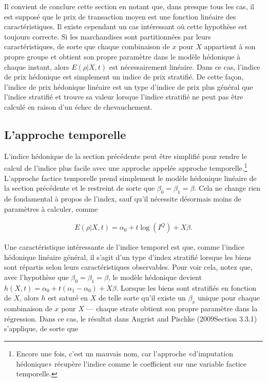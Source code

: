 \documentclass[
]{article}
\begin{document}
Il convient de conclure cette section en notant que, dans presque tous les cas, il est supposé que le prix de transaction moyen est une fonction linéaire des caractéristiques. Il existe cependant un cas intéressant où cette hypothèse est toujours correcte. Si les marchandises sont partitionnées par leurs caractéristiques, de sorte que chaque combinaison de \(x\) pour \(X\) appartient à son propre groupe et obtient son propre paramètre dans le modèle hédonique à chaque instant, alors \(E(\rho | X, t)\) est nécessairement linéaire. Dans ce cas, l'indice de prix hédonique est simplement un indice de prix stratifié. De cette façon, l'indice de prix hédonique linéaire est un type d'indice de prix plus général que l'indice stratifié et trouve sa valeur lorsque l'indice stratifié ne peut pas être calculé en raison d'un échec de chevauchement.

\hypertarget{lapproche-temporelle}{%
\subsection{L'approche temporelle}\label{lapproche-temporelle}}

L'indice hédonique de la section précédente peut être simplifié pour rendre le calcul de l'indice plus facile avec une approche appelée approche temporelle.\footnote{Encore une fois, c'est un mauvais nom, car l'approche «d'imputation hédonique» récupère l'indice comme le coefficient sur une variable factice temporelle.} L'approche factice temporelle prend simplement le modèle hédonique linéaire de la section précédente et le restreint de sorte que \(\beta_{0} = \beta_{1} = \beta\). Cela ne change rien de fondamental à propos de l'index, sauf qu'il nécessite désormais moins de paramètres à calculer, comme

\begin{align*}
E(\rho | X, t) = \alpha_{0} + t \log(I^{Q}) + X \beta.
\end{align*}

Une caractéristique intéressante de l'indice temporel est que, comme l'indice hédonique linéaire général, il s'agit d'un type d'index stratifié lorsque les biens sont répartis selon leurs caractéristiques observables. Pour voir cela, notez que, avec l'hypothèse que \(\beta_{0} = \beta_{1} = \beta\), le modèle hédonique devient \(h(X, t) = \alpha_{0} + t (\alpha_{1} - \alpha_{0}) + X \beta\). Lorsque les biens sont stratifiés en fonction de \(X\), alors \(h\) est saturé en \(X\) de telle sorte qu'il existe un \(\beta_x\) unique pour chaque combinaison de \(x\) pour \(X\) --- chaque strate obtient son propre paramètre dans la régression. Dans ce cas, le résultat dans Angrist and Pischke (2009Section 3.3.1) s'applique, de sorte que
\end{document}

